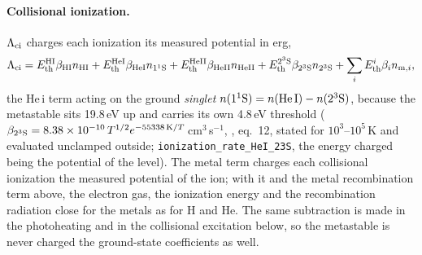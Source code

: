 \paragraph{Collisional ionization.} $\Lambda_{\rm ci}$ charges each
ionization its measured potential in erg,
\begin{equation}
\Lambda_{\rm ci} = E_{\rm th}^{\rm HI}\beta_{\rm HI}n_{\rm HI}
   + E_{\rm th}^{\rm HeI}\beta_{\rm HeI}n_{1^1{\rm S}}
   + E_{\rm th}^{\rm HeII}\beta_{\rm HeII}n_{\rm HeII}
   + E_{\rm th}^{2^3{\rm S}}\beta_{2^3{\rm S}}n_{2^3{\rm S}}
   + \sum_i E_{\rm th}^{i}\beta_i n_{{\rm m},i},
\label{eq:th:cicool}
\end{equation}
the He\,{\sc i} term acting on the ground \emph{singlet}
$n(1^1{\rm S}) = n({\rm He\,I}) - n(2^3{\rm S})$, because the metastable
sits 19.8\,eV up and carries its own 4.8\,eV threshold ($\beta_{2^3{\rm
S}} = 8.38\times10^{-10}\,T^{1/2}e^{-55338\,{\rm K}/T}$\,cm$^3$\,s$^{-1}$,
\citealt{Black1981}, eq.~12, stated for $10^3$--$10^5$\,K and evaluated
unclamped outside; \texttt{ionization\_rate\_HeI\_23S}, the energy charged
being the potential of the level). The metal term charges each
collisional ionization the measured potential of the ion; with it and the
metal recombination term above, the electron gas, the ionization energy and
the recombination radiation close for the metals as for H and He.
The same subtraction is made in the photoheating and in the collisional
excitation below, so the metastable is never charged the ground-state
coefficients as well.

